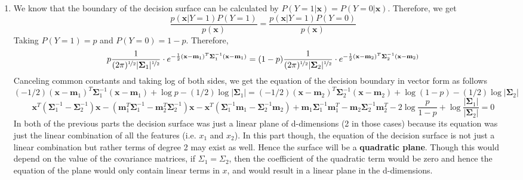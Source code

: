 \documentclass[twoside]{article}
\begin{document}
\begin{enumerate}
	\item
	We know that the boundary of the decision surface can be calculated by $P(Y=1|\mathbf{x})=P(Y=0|\mathbf{x})$.
	Therefore, we get
	\begin{equation*}
		\frac{p(\mathbf{x}|Y=1)P(Y=1)}{p(\mathbf{x})} = \frac{p(\mathbf{x}|Y=1)P(Y=0)}{p(\mathbf{x})}
	\end{equation*}
	Taking $P(Y=1) = p$ and $P(Y=0) = 1 - p$. Therefore,
	\begin{equation*}
		p\frac{1}{(2\pi)^{\nicefrac{1}{2}} |\mathbf{\Sigma}_{1}|^{\nicefrac{1}{2}}}\cdot e^{-\frac{1}{2}(\mathbf{x}-\mathbf{m}_{1})^{T}\mathbf{\Sigma}_{1}^{-1}(\mathbf{x}-\mathbf{m}_{1})} = (1-p)\frac{1}{(2\pi)^{\nicefrac{1}{2}} |\mathbf{\Sigma}_{2}|^{\nicefrac{1}{2}}}\cdot e^{-\frac{1}{2}(\mathbf{x}-\mathbf{m}_{2})^{T}\mathbf{\Sigma}_{2}^{-1}(\mathbf{x}-\mathbf{m}_{2})}
	\end{equation*}
	Canceling common constants and taking log of both sides, we get the equation of the decision boundary in vector form as follows
	\begin{equation*}
		(-1/2)(\mathbf{x}-\mathbf{m}_{1})^{T}\mathbf{\Sigma}_{1}^{-1}(\mathbf{x}-\mathbf{m}_{1}) + \log p -(1/2)\log|\mathbf{\Sigma}_1|= (-1/2)(\mathbf{x}-\mathbf{m}_{2})^{T}\mathbf{\Sigma}_{2}^{-1}(\mathbf{x}-\mathbf{m}_{2}) + \log (1 - p) -(1/2)\log|\mathbf{\Sigma}_2|
	\end{equation*}
	\begin{equation*}
		\mathbf{x}^T(\mathbf{\Sigma}_1^{-1} - \mathbf{\Sigma}_2^{-1})\mathbf{x} - (\mathbf{m}_{1}^T\mathbf{\Sigma}_1^{-1} - \mathbf{m}_{2}^T\mathbf{\Sigma}_2^{-1})\mathbf{x} - \mathbf{x}^T(\mathbf{\Sigma}_1^{-1}\mathbf{m}_{1} - \mathbf{\Sigma}_2^{-1}\mathbf{m}_{2}) + \mathbf{m}_{1}\mathbf{\Sigma}_1^{-1}\mathbf{m}_{1}^T - \mathbf{m}_{2}\mathbf{\Sigma}_2^{-1}\mathbf{m}_{2}^T -2\log \frac{p}{1-p} + \log\frac{|\mathbf{\Sigma}_1|}{|\mathbf{\Sigma}_2|} = 0
	\end{equation*}
	In both of the previous parts the decision surface was just a linear plane of d-dimensions (2 in those cases) because its equation was just the linear combination of all the features (i.e. $x_1$ and $x_2$). In this part though, the equation of the decision surface is not just a linear combination but rather terms of degree 2 may exist as well. Hence the surface will be a \textbf{quadratic plane}. Though this would depend on the value of the covariance matrices, if $\Sigma_1 = \Sigma_2$, then the coefficient of the quadratic term would be zero and hence the equation of the plane would only contain linear terms in $x$, and would result in a linear plane in the d-dimensions.

\end{enumerate}
\end{document}
